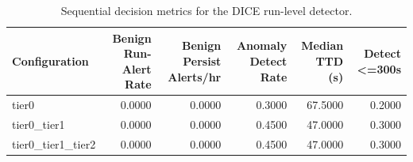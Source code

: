\begin{table}[t]
\centering
\caption{Sequential decision metrics for the DICE run-level detector.}
\label{tab:dice_sequential_metrics}
\footnotesize
\begin{tabular}{lrrrrr}
\toprule
Configuration & Benign Run-Alert Rate & Benign Persist Alerts/hr & Anomaly Detect Rate & Median TTD (s) & Detect <=300s \\
\midrule
tier0 & 0.0000 & 0.0000 & 0.3000 & 67.5000 & 0.2000 \\
tier0_tier1 & 0.0000 & 0.0000 & 0.4500 & 47.0000 & 0.3000 \\
tier0_tier1_tier2 & 0.0000 & 0.0000 & 0.4500 & 47.0000 & 0.3000 \\
\bottomrule
\end{tabular}

\end{table}
